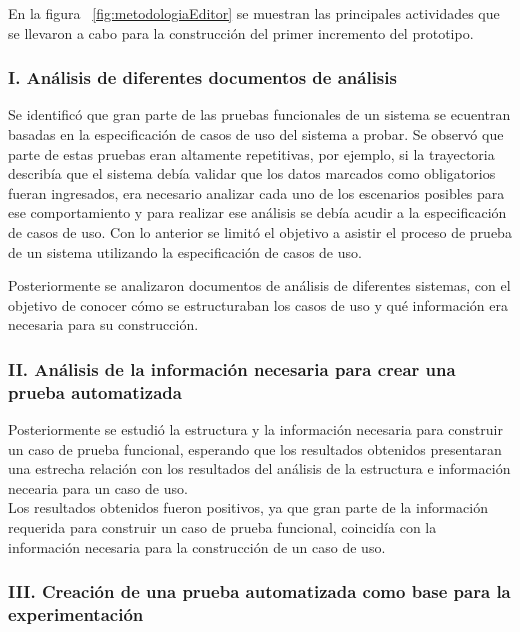 	En la figura ~\ref{fig:metodologiaEditor} se muestran las principales actividades que se llevaron a cabo para la construcción del primer incremento del prototipo.
	
	
\subsubsection{I. Análisis de diferentes documentos de análisis}
	Se identificó que gran parte de las pruebas funcionales de un sistema se ecuentran basadas en la especificación de casos de uso del sistema a probar. Se observó que parte de estas pruebas eran altamente repetitivas, por ejemplo, si la trayectoria describía que el sistema debía validar que los datos marcados como obligatorios fueran ingresados, era  necesario analizar cada uno de los escenarios posibles para ese comportamiento y para realizar ese análisis se debía acudir a la especificación de casos de uso. Con lo anterior se limitó el objetivo a asistir el proceso de prueba de un sistema utilizando la especificación de casos de uso.
	
	Posteriormente se analizaron documentos de análisis de diferentes sistemas, con el objetivo de conocer cómo se estructuraban los casos de uso y qué información era necesaria para su construcción.
	
	
\subsubsection{II. Análisis de la información necesaria para crear una prueba automatizada}
		
	Posteriormente se estudió la estructura y la información necesaria para construir un caso de prueba funcional, esperando que los resultados obtenidos presentaran una estrecha relación con los resultados del análisis de la estructura e información necearia para un caso de uso.\\
		
	Los resultados obtenidos fueron positivos, ya que gran parte de la información requerida para construir un caso de prueba funcional, coincidía con la información necesaria para la construcción de un caso de uso.


\subsubsection{III. Creación de una prueba automatizada como base para la experimentación}

